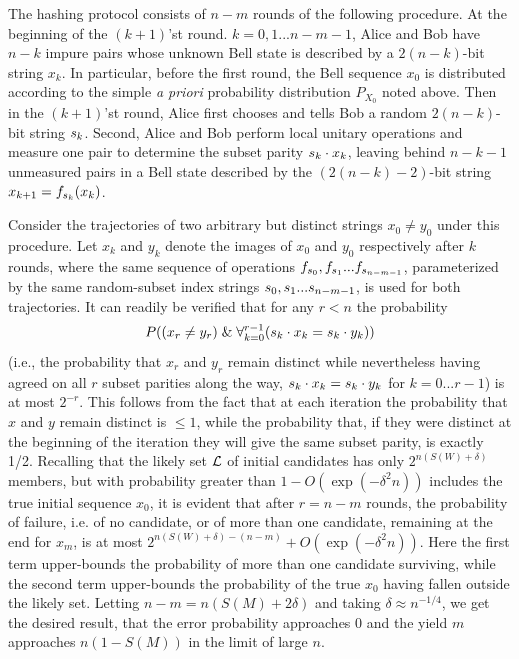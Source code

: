 The hashing protocol consists of $n\!-\!m$ rounds of the following
procedure.  At the beginning of the $(k+1)$'st round.
$k=0,1...n-m-1$, Alice and Bob have $n-k$ impure pairs whose unknown
Bell state is described by a $2(n-k)$-bit string $x_k$.  In
particular, before the first round, the Bell sequence $x_0$ is
distributed according to the simple {\it a priori} probability
distribution $P_{X_0}$ noted above.  Then in the $(k+1)$'st
round, Alice first chooses and tells Bob a random $2(n-k)$-bit
string ${\sl s}_k$.  Second, Alice and Bob perform local unitary
operations and measure one pair to determine the subset parity ${\sl
s}_k\cdot x_k$, leaving behind $n-k-1$ unmeasured pairs in a Bell state
described by the $(2(n-k)-2)$-bit string $x_{k+1}=f_{{\sl s}_k}(x_k)$.
 
Consider the trajectories of two arbitrary but distinct strings
$x_0\neq y_0$ under this procedure.  Let $x_k$ and $y_k$ denote
the images of $x_0$ and $y_0$ respectively after $k$ rounds,
where the same sequence of operations $f_{{\sl s}_0}, f_{{\sl
s}_1}...f_{{\sl s}_{n-m-1}}$, parameterized by the same random-subset
index strings ${\sl s}_0, {\sl s}_1...{\sl s}_{n-m-1}$, is used for
both trajectories.  It can readily be verified that for any $r<n$
the probability
\begin{equation}
P((x_r \neq y_r)\;\& \;\forall_{k=0}^{r-1} ({\sl s}_k\cdot x_k =
{\sl s}_k \cdot y_k))
\end{equation}
(i.e., the probability that $x_r$ and $y_r$ remain distinct while
nevertheless having agreed on all $r$ subset parities along the way,
${\sl s}_k\cdot x_k={\sl s}_k\cdot y_k$ for $k=0...r-1$) is at most
$2^{-r}$.  This follows from the fact that at each iteration the
probability that $x$ and $y$ remain distinct is $\leq 1$, while the
probability that, if they were distinct at the beginning of the
iteration they will give the same subset parity, is exactly 1/2.
Recalling that the likely set ${\cal L}$ of initial candidates has
only $2^{n(S(W)+\delta)}$ members, but with probability greater than
$1-O(\exp(-\delta^2n))$ includes the true initial sequence $x_0$, it
is evident that after $r=n\!-\!m$ rounds, the probability of failure,
i.e. of no candidate, or of more than one candidate, remaining at the
end for $x_m$, is at most
$2^{n(S(W)+\delta)-(n\!-\!m)}+O(\exp(-\delta^2n))$.  Here the first term
upper-bounds the probability of more than one candidate surviving,
while the second term upper-bounds the probability of the true $x_0$
having fallen outside the likely set.  Letting $n\!-\!m=n(S(M)+2\delta)$
and taking $\delta\approx n^{-1/4}$, we get the desired result, that
the error probability approaches 0 and the yield $m$ approaches
$n(1\!-\!S(M))$ in the limit of large $n$.
 
